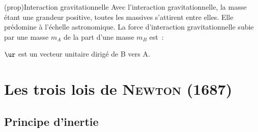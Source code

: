 \documentclass[../../main/main.tex]{subfiles}
\begin{document}
\begin{tcb*}(prop){Interaction gravitationnelle}
	Avec l'interaction gravitationnelle, la masse étant une grandeur positive,
	toutes les massives s'attirent entre elles. Elle prédomine à l'échelle
	astronomique.
	\smallbreak
	La force d'interaction gravitationnelle subie par une masse
	$m_A$ de la part d'une masse $m_B$ est~:
	\smallbreak
	\begin{isd}
		\psw{
			\[
				\Ff_{g,\rm B\ra A} = -\Gc \frac{m_Am_B}{\rm BA^2}\ur
				\qavec
				\ur = \frac{\vv{\rm BA}}{\rm BA}
			\]
		}
		$\ur$ est un vecteur unitaire dirigé de B vers A.
		\tcblower
		\begin{center}
			\vspace{-15pt}
		\end{center}
	\end{isd}
\end{tcb*}

\section{Les trois lois de \textsc{Newton} (1687)}
\subsection{Principe d'inertie}
\end{document}
